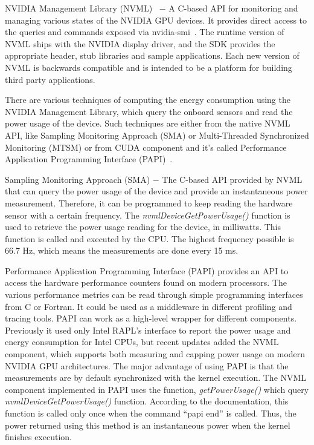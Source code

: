 NVIDIA Management Library (NVML)~\cite{NVML} $-$ A C-based API
for monitoring and managing various states of the NVIDIA GPU
devices. It provides direct access to the queries and commands
exposed via nvidia-smi~\cite{NVIDIA_SMI}.
The runtime version of NVML ships
with the NVIDIA display driver, and the SDK provides the
appropriate header, stub libraries and sample applications.
Each new version of NVML is backwards compatible and is intended
to be a platform for building third party applications.

There are various techniques of computing the energy consumption
using the NVIDIA Management Library, which query the onboard
sensors and read the power usage of the device. Such techniques
are either from the native NVML API, like Sampling Monitoring
Approach (SMA) or Multi-Threaded Synchronized Monitoring (MTSM)
or from CUDA component and it's called Performance Application
Programming Interface (PAPI)~\cite{PAPI_CUDA}.

Sampling Monitoring Approach (SMA) $-$ The C-based API provided
by NVML that can query the power usage of the device and provide
an instantaneous power measurement. Therefore, it can be
programmed to keep reading the hardware sensor with a certain
frequency. The \emph{nvmlDeviceGetPowerUsage\@()} function is
used to retrieve the power usage reading for the device, in
milliwatts. This function is called and executed by the CPU\@.
The highest frequency possible is 66.7 Hz, which means the
measurements are done every 15 ms.

Performance Application Programming Interface (PAPI) provides
an API to access the hardware performance counters found on
modern processors. The various performance metrics can be read
through simple programming interfaces from C or Fortran. It
could be used as a middleware in different profiling and tracing
tools. PAPI can work as a high-level wrapper for different
components. Previously it used only Intel RAPL's interface to
report the power usage and energy consumption for Intel CPUs,
but recent updates added the NVML component, which supports
both measuring and capping power usage on modern NVIDIA GPU
architectures. The major advantage of using PAPI is that the
measurements are by default synchronized with the kernel execution.
The NVML component implemented in PAPI uses the function,
\emph{getPowerUsage\@()} which query \emph{nvmlDeviceGetPowerUsage\@()}
function. According to the documentation, this function is called
only once when the command “papi end” is called. Thus, the power
returned using this method is an instantaneous power when the
kernel finishes execution.

